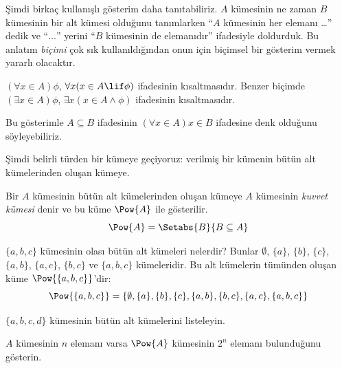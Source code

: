Şimdi birkaç kullanışlı gösterim daha tanıtabiliriz. $A$ kümesinin ne zaman
$B$ kümesinin bir alt kümesi olduğunu tanımlarken ``$A$ kümesinin her elemanı
\dots'' dedik ve ``$\dots$'' yerini ``$B$ kümesinin de elemanıdır''
ifadesiyle doldurduk. Bu anlatım \emph{biçimi} çok sık kullanıldığından onun
için biçimsel bir gösterim vermek yararlı olacaktır.

\begin{defn}
$(\forall x \in A)\phi$, $\forall x(x \in A \lif \phi)$ ifadesinin
kısaltmasıdır. Benzer biçimde $(\exists x \in A)\phi$,
$\exists x(x \in A \land \phi)$ ifadesinin kısaltmasıdır.
\end{defn}

Bu gösterimle $A \subseteq B$ ifadesinin $(\forall x \in A)x \in B$
ifadesine denk olduğunu söyleyebiliriz.

Şimdi belirli türden bir kümeye geçiyoruz: verilmiş bir kümenin bütün
alt kümelerinden oluşan kümeye.

\begin{defn}
Bir $A$ kümesinin bütün alt kümelerinden oluşan kümeye $A$ kümesinin
\emph{kuvvet kümesi} denir ve bu küme $\Pow{A}$ ile gösterilir.
  \[
    \Pow{A} = \Setabs{B}{B \subseteq A}
  \]
\end{defn}

\begin{ex}
$\{ a, b, c \}$ kümesinin olası bütün alt kümeleri nelerdir? Bunlar
$\emptyset$, $\{a \}$, $\{b\}$, $\{c\}$, $\{a, b\}$, $\{a, c\}$,
$\{b, c\}$ ve $\{a, b, c\}$ kümeleridir. Bu alt kümelerin tümünden oluşan
küme $\Pow{\{a,b,c\}}$'dir:
\[
\Pow{\{ a, b, c \}} = \{\emptyset, \{a \}, \{b\}, \{c\}, \{a, b\},
\{b, c\}, \{a, c\}, \{a, b, c\}\}
\]
\end{ex}

\begin{prob}
$\{a, b, c, d\}$ kümesinin bütün alt kümelerini listeleyin.
\end{prob}

\begin{prob}
$A$ kümesinin $n$ elemanı varsa $\Pow{A}$ kümesinin $2^n$ elemanı bulunduğunu
gösterin.
\end{prob}

